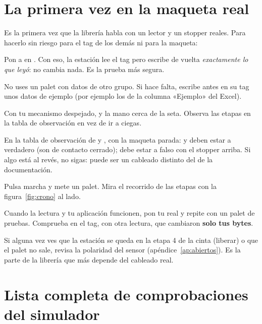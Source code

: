 \section{La primera vez en la maqueta real}\label{sec:primera-vez}
Es la primera vez que la librería habla con un lector y un stopper reales. Para hacerlo sin riesgo para el tag de los demás ni para la maqueta:

\reiniciapaso
{}
Pon  a  en . Con eso, la estación lee el tag pero escribe de vuelta \emph{exactamente lo que leyó}: no cambia nada. Es la prueba más segura.

No uses un palet con datos de otro grupo. Si hace falta, escribe antes en su tag unos datos de ejemplo (por ejemplo los de la columna «Ejemplo» del Excel).

Con tu mecanismo despejado, y la mano cerca de la seta. Observa las etapas en la tabla de observación en vez de ir a ciegas.

En la tabla de observación de  y , con la maqueta parada:  y  deben estar a verdadero (son de contacto cerrado);  debe estar a falso con el stopper arriba. Si algo está al revés, no sigas: puede ser un cableado distinto del de la documentación.

Pulsa marcha y mete un palet. Mira el recorrido de las etapas con la figura~\ref{fig:crono} al lado.

Cuando la lectura y tu aplicación funcionen, pon tu  real y repite con un palet de pruebas. Comprueba en el tag, con otra lectura, que cambiaron \textbf{solo tus bytes}.

\begin{ojo}
Si alguna vez ves que la estación se queda en la etapa 4 de la cinta (liberar) o que el palet no sale, revisa la polaridad del sensor  (apéndice~\ref{ap:abiertos}). Es la parte de la librería que más depende del cableado real.
\end{ojo}

\section{Lista completa de comprobaciones del simulador}
\small

\normalsize
